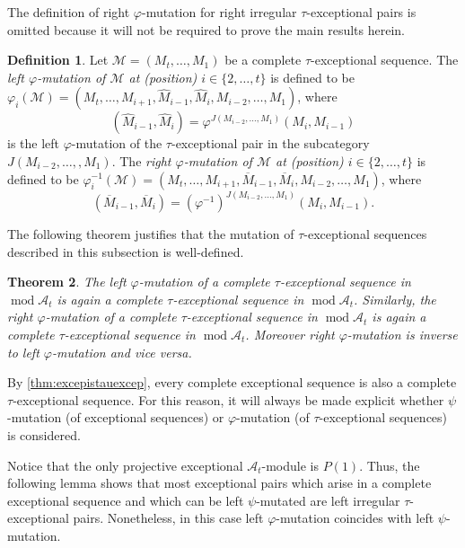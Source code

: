 \documentclass[10pt,twoside, a4paper,reqno]{amsart}
\DeclareMathOperator{\mods}{mod}
\newcommand{\A}{\mathscr{A}}
\newtheorem{theorem}{Theorem}[section]
\theoremstyle{definition}
\newtheorem{definition}[theorem]{Definition}
\begin{document}
The definition of right $\varphi$-mutation for right irregular $\tau$-exceptional pairs is omitted because it will not be required to prove the main results herein.


\begin{definition}\label{def:completetauexcepmut}
    Let $\mathcal{M} = (M_t, \dots, M_1)$ be a complete $\tau$-exceptional sequence. The \textit{left $\varphi$-mutation of $\mathcal{M}$ at (position) $i \in \{2, \dots, t\}$} is defined to be $\varphi_i(\mathcal{M}) = (M_t, \dots, M_{i+1}, \widehat{M}_{i-1}, \widehat{M}_i, M_{i-2}, \dots, M_1)$, where
    \[ (\widehat{M}_{i-1}, \widehat{M}_{i}) = \varphi^{J(M_{i-2}, \dots, M_1)}(M_i, M_{i-1})\]
    is the left $\varphi$-mutation of the $\tau$-exceptional pair in the subcategory $J(M_{i-2}, \dots, , M_1)$.
    The \textit{right $\varphi$-mutation of $\mathcal{M}$ at (position) $i \in \{2, \dots, t\}$} is defined to be $\varphi_i^{-1}(\mathcal{M}) = (M_t, \dots, M_{i+1}, \overline{M}_{i-1}, \overline{M}_i, M_{i-2}, \dots, M_1)$, where
    \[(\overline{M}_{i-1}, \overline{M}_i) = (\varphi^{-1})^{J(M_{i-2}, \dots, M_1)}(M_i, M_{i-1}).\]
\end{definition}

The following theorem justifies that the mutation of $\tau$-exceptional sequences described in this subsection is well-defined.
\begin{theorem}\cite[Thm. 0.1, Cor. 0.4]{BHM2024}\label{thm:BHMmut}
    The left $\varphi$-mutation of a complete $\tau$-exceptional sequence in $\mods \A_t$ is again a complete $\tau$-exceptional sequence in $\mods \A_t$. Similarly, the right $\varphi$-mutation of a complete $\tau$-exceptional sequence in $\mods \A_t$ is again a complete $\tau$-exceptional sequence in $\mods \A_t$. Moreover right $\varphi$-mutation is inverse to left $\varphi$-mutation and vice versa.
\end{theorem}

By \cref{thm:excepistauexcep}, every complete exceptional sequence is also a complete $\tau$-exceptional sequence. For this reason, it will always be made explicit whether $\psi$-mutation (of exceptional sequences) or $\varphi$-mutation (of $\tau$-exceptional sequences) is considered.




Notice that the only projective exceptional $\A_t$-module is $P(1)$. Thus, the following lemma shows that most exceptional pairs which arise in a complete exceptional sequence and which can be left $\psi$-mutated are left irregular $\tau$-exceptional pairs. Nonetheless, in this case left $\varphi$-mutation coincides with left $\psi$-mutation. 
\end{document}
